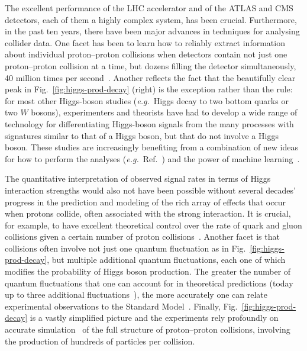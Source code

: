 \documentclass[12pt]{article}
\begin{document}
The excellent performance of the LHC accelerator and of the ATLAS and
CMS detectors, each of them a highly complex system, has been crucial.
%
Furthermore, in the past ten years, there have been major advances in
techniques for analysing collider data.
%
One facet has been to learn how to reliably extract information about
individual proton--proton collisions when detectors contain not just
one proton--proton collision at a time, but dozens filling the
detector simultaneously, 40 million times per
second~\cite{Cacciari:2007fd,Bertolini:2014bba}.
%
Another reflects the fact that the beautifully clear peak in
Fig.~\ref{fig:higgs-prod-decay} (right) is the exception rather than
the rule:
%
for most other Higgs-boson studies ({\it e.g.}\ Higgs decay to
two bottom quarks or
two $W$ bosons), experimenters and theorists have
had to develop a wide range of technology for differentiating
Higgs-boson signals from the many processes with signatures
similar to that of a Higgs boson, but that do not involve a Higgs
boson.
%
These studies are increasingly benefiting from
a combination of new ideas for
how to perform the analyses ({\it e.g.}\ Ref.~\cite{Marzani:2019hun})
and the power of machine
learning~\cite{Guest:2018yhq}.

%
The quantitative interpretation of observed signal rates in terms of
Higgs interaction strengths would also not have been possible without
several decades' progress in the prediction and modeling of the rich
array of
effects that occur when protons collide, often associated with the
strong interaction.
%
It is crucial, for example, to have excellent theoretical control over
the rate of quark and gluon collisions given a certain number of
proton collisions~\cite{Gao:2017yyd,Ball:2022hsh}.
%
Another facet is that collisions often involve not just one quantum
fluctuation as in Fig.~\ref{fig:higgs-prod-decay}, but multiple
additional quantum fluctuations, each one of which modifies the
probability of Higgs boson production.
%
The greater the number of quantum fluctuations that one can account
for in theoretical predictions (today up to three additional
fluctuations~\cite{Anastasiou:2015vya}), the more accurately one can
relate experimental observations to the Standard
Model~\cite{Heinrich:2020ybq,LHCHiggsCrossSectionWorkingGroup:2016ypw}.
%
Finally, Fig.~\ref{fig:higgs-prod-decay} is a vastly
simplified picture and the experiments rely profoundly on
accurate simulation~\cite{Buckley:2011ms,Campbell:2022qmc} of the full
structure of proton--proton collisions, involving the production of
hundreds of particles per collision.
% 
\end{document}
